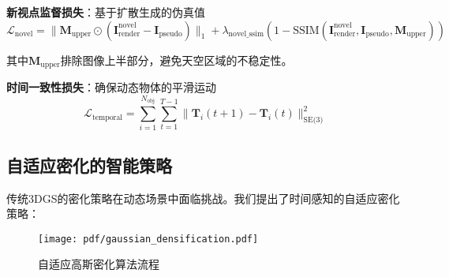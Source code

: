 \textbf{新视点监督损失}：基于扩散生成的伪真值
\begin{equation}
\mathcal{L}_{\text{novel}} = \|\mathbf{M}_{\text{upper}} \odot (\mathbf{I}_{\text{render}}^{\text{novel}} - \mathbf{I}_{\text{pseudo}})\|_1 + \lambda_{\text{novel\_ssim}} (1 - \text{SSIM}(\mathbf{I}_{\text{render}}^{\text{novel}}, \mathbf{I}_{\text{pseudo}}, \mathbf{M}_{\text{upper}}))
\label{eq:novel_supervision_loss}
\end{equation}

其中$\mathbf{M}_{\text{upper}}$排除图像上半部分，避免天空区域的不稳定性。

\textbf{时间一致性损失}：确保动态物体的平滑运动
\begin{equation}
\mathcal{L}_{\text{temporal}} = \sum_{i=1}^{N_{\text{obj}}} \sum_{t=1}^{T-1} \|\mathbf{T}_i(t+1) - \mathbf{T}_i(t)\|_{\text{SE(3)}}^2
\label{eq:temporal_consistency}
\end{equation}

\subsection{自适应密化的智能策略}

传统3DGS的密化策略在动态场景中面临挑战。我们提出了时间感知的自适应密化策略：

\begin{figure}[htbp]
  \centering
  \texttt{[image: pdf/gaussian\_densification.pdf]}
  \caption{自适应高斯密化算法流程}
  \label{fig:gaussian-densification}
\end{figure}

